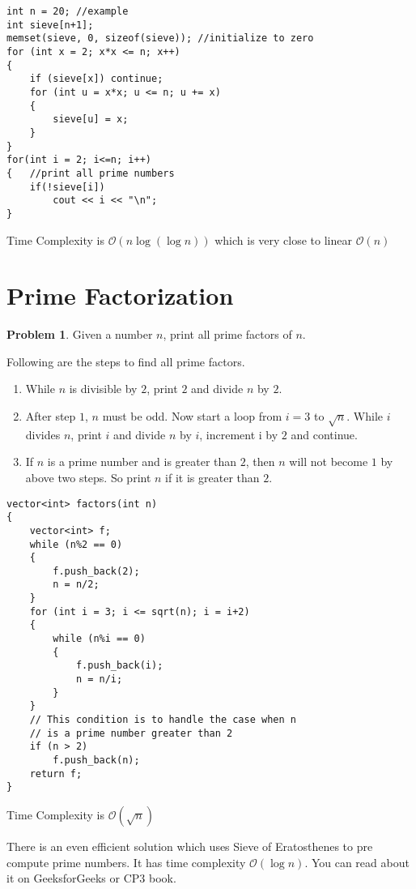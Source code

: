 \documentclass[twoside,12pt,a4paper,english]{book}
\theoremstyle{definition}
\theoremstyle{problemstyle}
\newtheorem*{problem}{Problem} %
\theoremstyle{problemstyle}
\theoremstyle{problemstyle}
\begin{document}
\begin{tcolorbox}[title=Solution]
\begin{center}
\begin{tikzpicture}[scale=0.6]
\end{tikzpicture}
\end{center}

\begin{lstlisting}
int n = 20; //example
int sieve[n+1];
memset(sieve, 0, sizeof(sieve)); //initialize to zero
for (int x = 2; x*x <= n; x++)
{
    if (sieve[x]) continue;
    for (int u = x*x; u <= n; u += x)
    {
        sieve[u] = x;
    }
}
for(int i = 2; i<=n; i++)
{   //print all prime numbers
    if(!sieve[i])
        cout << i << "\n";
}
\end{lstlisting}
Time Complexity is $\mathcal{O}(n\log{(\log{n})})$ which is very close to linear $\mathcal{O}(n)$
\end{tcolorbox}
\section{Prime Factorization}
\begin{problem}
Given a number $n$, print all prime factors of $n$.
\end{problem}
\begin{tcolorbox}[title=Solution]

Following are the steps to find all prime factors.
\begin{enumerate}
    \item While $n$ is divisible by $2$, print $2$ and divide $n$ by $2$.
    \item After step $1$, $n$ must be odd. Now start a loop from $i = 3$ to $\sqrt{n}$. While $i$ divides $n$, print $i$ and divide $n$ by $i$, increment i by $2$ and continue.
    \item If $n$ is a prime number and is greater than $2$, then $n$ will not become $1$ by above two steps. So print $n$ if it is greater than $2$.
\end{enumerate}
\begin{lstlisting}
vector<int> factors(int n)
{
    vector<int> f;
    while (n%2 == 0)
    {
        f.push_back(2);
        n = n/2;
    }
    for (int i = 3; i <= sqrt(n); i = i+2)
    {
        while (n%i == 0)
        {
            f.push_back(i);
            n = n/i;
        }
    }
    // This condition is to handle the case when n
    // is a prime number greater than 2
    if (n > 2)
        f.push_back(n);
    return f;
}
\end{lstlisting}
Time Complexity is $\mathcal{O}(\sqrt{n})$

There is an even efficient solution which uses Sieve of Eratosthenes to pre compute prime numbers. It has time complexity $\mathcal{O}(\log{n})$. You can read about it on GeeksforGeeks or CP3 book.
\end{tcolorbox}
\end{document}
